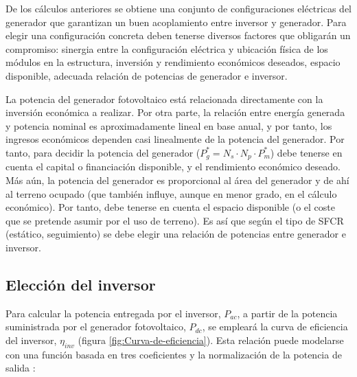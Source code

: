 De los cálculos anteriores se obtiene una conjunto de configuraciones eléctricas
del generador que garantizan un buen acoplamiento entre inversor y
generador. Para elegir una configuración concreta deben tenerse diversos
factores que obligarán un compromiso: sinergia entre la configuración
eléctrica y ubicación física de los módulos en la estructura, inversión
y rendimiento económicos deseados, espacio disponible, adecuada relación
de potencias de generador e inversor.

La potencia del generador fotovoltaico está relacionada directamente
con la inversión económica a realizar. Por otra parte, la relación
entre energía generada y potencia nominal es aproximadamente lineal
en base anual, y por tanto, los ingresos económicos dependen casi
linealmente de la potencia del generador. Por tanto, para decidir
la potencia del generador ($P_{g}^{*}=N_{s}\cdot N_{p}\cdot
P_{m}^{*}$)
debe tenerse en cuenta el capital o financiación disponible, y el
rendimiento económico deseado. Más aún, la potencia del generador
es proporcional al área del generador y de ahí al terreno ocupado
(que también influye, aunque en menor grado, en el cálculo económico).
Por tanto, debe tenerse en cuenta el espacio disponible (o el coste
que se pretende asumir por el uso de terreno). Es así que según el
tipo de SFCR (estático, seguimiento) se debe elegir una relación de
potencias entre generador e inversor. 


\subsection{Elección del inversor}

Para calcular la potencia entregada por el inversor, $P_{ac}$,
a partir de la potencia suministrada por el generador fotovoltaico,
$P_{dc}$, se empleará la curva de eficiencia del inversor, $\eta_{inv}$
(figura \ref{fig:Curva-de-eficiencia}). Esta relación puede modelarse
con una función basada en tres coeficientes y la normalización de
la potencia de salida \cite{Jantsch.Schmidt.ea1992}:

